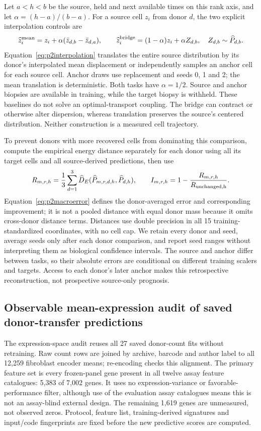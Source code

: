 \documentclass[10pt,a4paper]{article}
\begin{document}
Let $a<h<b$ be the source, held and next available times on this rank axis, and let $\alpha=(h-a)/(b-a)$. For a source cell $z_i$ from donor $d$, the two explicit interpolation controls are
\begin{equation}
\widehat z_i^{\rm mean}=z_i+\alpha(\bar z_{d,b}-\bar z_{d,a}),\qquad
\widehat z_i^{\rm bridge}=(1-\alpha)z_i+\alpha Z_{d,b},\quad
Z_{d,b}\sim\widehat P_{d,b}.\label{eq:p2interpolation}
\end{equation}
Equation~\eqref{eq:p2interpolation} translates the entire source distribution by its donor's interpolated mean displacement or independently samples an anchor cell for each source cell. Anchor draws use replacement and seeds 0, 1 and 2; the mean translation is deterministic. Both tasks have $\alpha=1/2$. Source and anchor biopsies are available in training, while the target biopsy is withheld. These baselines do not solve an optimal-transport coupling. The bridge can contract or otherwise alter dispersion, whereas translation preserves the source's centered distribution. Neither construction is a measured cell trajectory.

To prevent donors with more recovered cells from dominating this comparison, compute the empirical energy distance separately for each donor using all its target cells and all source-derived predictions, then use
\begin{equation}
R_{m,r,h}=\frac13\sum_{d=1}^{3}\widehat D_E(\widehat P_{m,r,d,h},\widehat P_{d,h}),\qquad
I_{m,r,h}=1-\frac{R_{m,r,h}}{R_{\rm unchanged,h}}.\label{eq:p2macroerror}
\end{equation}
Equation~\eqref{eq:p2macroerror} defines the donor-averaged error and corresponding improvement; it is not a pooled distance with equal donor mass because it omits cross-donor distance terms. Distances use double precision in all 15 training-standardized coordinates, with no cell cap. We retain every donor and seed, average seeds only after each donor comparison, and report seed ranges without interpreting them as biological confidence intervals. The source and anchor differ between tasks, so their absolute errors are conditional on different training scalers and targets. Access to each donor's later anchor makes this retrospective reconstruction, not prospective source-only prognosis.

\subsection{Observable mean-expression audit of saved donor-transfer predictions}
The expression-space audit reuses all 27 saved donor-count fits without retraining. Raw count rows are joined by archive, barcode and author label to all 12,259 fibroblast encoder means; re-encoding checks this alignment. The primary feature set is every frozen-panel gene present in all twelve assay feature catalogues: 5,383 of 7,002 genes. It uses no expression-variance or favorable-performance filter, although use of the evaluation assay catalogues means this is not an assay-blind external design. The remaining 1,619 genes are unmeasured, not observed zeros. Protocol, feature list, training-derived signatures and input/code fingerprints are fixed before the new predictive scores are computed.
\end{document}
